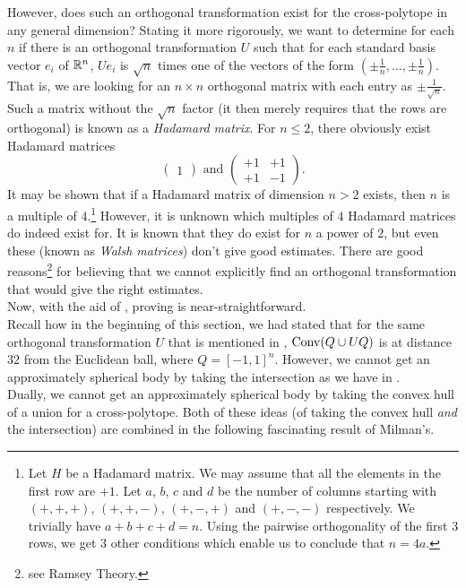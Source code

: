 However, does such an orthogonal transformation exist for the cross-polytope in any general dimension? Stating it more rigorously, we want to determine for each $n$ if there is an orthogonal transformation $U$ such that for each standard basis vector $e_i$ of $\mathbb{R}^n$, $U e_i$ is $\sqrt{n}$ times one of the vectors of the form $(\pm \frac{1}{n},\ldots,\pm \frac{1}{n})$.\\
That is, we are looking for an $n\times n$ orthogonal matrix with each entry as $\pm \frac{1}{\sqrt{n}}$. Such a matrix without the $\sqrt{n}$ factor (it then merely requires that the rows are orthogonal) is known as a \textit{Hadamard matrix}. For $n\leq 2$, there obviously exist Hadamard matrices
\[
\begin{pmatrix}
1
\end{pmatrix}
\text{ and }
\begin{pmatrix}
+1 & +1 \\
+1 & -1
\end{pmatrix}.
\]
It may be shown that if a Hadamard matrix of dimension $n>2$ exists, then $n$ is a multiple of $4$.\footnote{Let $H$ be a Hadamard matrix. We may assume that all the elements in the first row are $+1$. Let $a$, $b$, $c$ and $d$ be the number of columns starting with $(+,+,+)$, $(+,+,-)$, $(+,-,+)$ and $(+,-,-)$ respectively. We trivially have $a+b+c+d=n$. Using the pairwise orthogonality of the first $3$ rows, we get $3$ other conditions which enable us to conclude that $n=4a$.} However, it is unknown which multiples of $4$ Hadamard matrices do indeed exist for. It is known that they do exist for $n$ a power of $2$, but even these (known as \textit{Walsh matrices}) don't give good estimates. There are good reasons\footnote{see Ramsey Theory.} for believing that we cannot explicitly find an orthogonal transformation that would give the right estimates.\\

Now, with the aid of , proving  is near-straightforward.\\
Recall how in the beginning of this section, we had stated that for the same orthogonal transformation $U$ that is mentioned in , $\operatorname{Conv}(Q\cup U Q)$ is at distance $32$ from the Euclidean ball, where $Q=[-1,1]^n$. However, we cannot get an approximately spherical body by taking the intersection as we have in .\\
Dually, we cannot get an approximately spherical body by taking the convex hull of a union for a cross-polytope. Both of these ideas (of taking the convex hull \textit{and} the intersection) are combined in the following fascinating result of Milman's.

